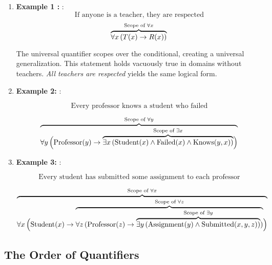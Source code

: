 \documentclass[12pt,a4paper,openany]{article}
\begin{document}
\begin{enumerate}
\def\labelenumi{\arabic{enumi}.}
\item
  \textbf{Example 1 :} : \[\text{If anyone is a teacher, they are respected}\] \[
   \color{black}{\overbrace{\color{black}\forall x \, (T(x) \to R(x))}^{\color{black}\text{Scope of } \forall x}}
   \]

  The universal quantifier scopes over the conditional, creating a
  universal generalization. This statement holds vacuously true in
  domains without teachers. \emph{All teachers are respected} yields the
  same logical form.
\item
  \textbf{Example 2:} :

  \[\text{Every professor knows a student who failed}\]

  \[
   {\color{black}\overbrace{\color{black}\forall y \, \Big( \text{Professor}(y) \to
   {\color{black}\overbrace{\color{black}\exists x \, (\text{Student}(x) \wedge \text{Failed}(x) \wedge \text{Knows}(y,x))}^{\color{black}\text{Scope of } \exists x}} \Big)}^{\color{black}\text{Scope of } \forall y}}
   \]
\item
  \textbf{Example 3:} :

  \[\text{Every student has submitted some assignment to each professor}\]

  \[
   {\color{black}\overbrace{\color{black}\forall x \, \Big( \text{Student}(x) \to
   {\color{black}\overbrace{\color{black}\forall z \, (\text{Professor}(z) \to 
   {\color{black}\overbrace{\color{black}\exists y \, (\text{Assignment}(y) \wedge \text{Submitted}(x,y,z))}^{\color{black}\text{Scope of } \exists y}})}^{\color{black}\text{Scope of } \forall z}} \Big)}^{\color{black}\text{Scope of } \forall x}}
   \]
\end{enumerate}

\subsection{The Order of
Quantifiers}\label{the-order-of-quantifiers}
\end{document}
